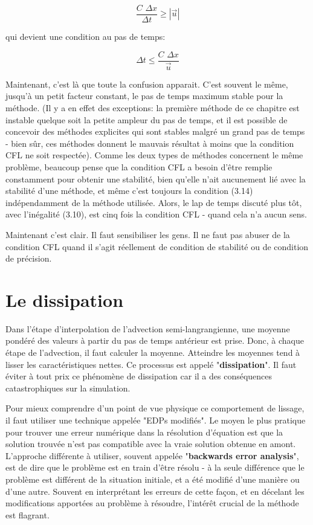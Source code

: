 \documentclass[11pt]{report}
\begin{document}
\begin{equation}
\frac{C\,\,\Delta x}{\Delta t} \geq |\overrightarrow{u}|
\end{equation}

qui devient une condition au pas de temps:

\begin{equation}
\Delta t \leq \frac{C\,\,\Delta x}{\overrightarrow{u}}
\end{equation}

Maintenant, c'est là que toute la confusion apparait. C'est souvent le même, jusqu'à un petit facteur constant, le pas de temps maximum stable pour la méthode. (Il y a en effet des exceptions: la première méthode de ce chapitre est instable quelque soit la petite ampleur du pas de temps, et il est possible de concevoir des méthodes explicites qui sont stables malgré un grand pas de temps - bien sûr, ces méthodes donnent le mauvais résultat à moins que la condition CFL ne soit respectée). Comme les deux types de méthodes concernent le même problème, beaucoup pense que la condition CFL a besoin d'être remplie constamment pour obtenir une stabilité, bien qu'elle n'ait aucunement lié avec la stabilité d'une méthode, et même c'est toujours la condition (3.14) indépendamment de la méthode utilisée. Alors, le lap de temps discuté plus tôt, avec l'inégalité (3.10), est cinq fois la condition CFL - quand cela n'a aucun sens.\newline

Maintenant c'est clair. Il faut sensibiliser les gens. Il ne faut pas abuser de la condition CFL quand il s'agit réellement de condition de stabilité ou de condition de précision. 

\section{Le dissipation}

Dans l'étape d'interpolation de l'advection semi-langrangienne, une moyenne pondéré des valeurs à partir du pas de temps antérieur est prise. Donc, à chaque étape de l'advection, il faut calculer la moyenne. Atteindre les moyennes tend à lisser les caractéristiques nettes. Ce processus est appelé "\textbf{dissipation}". Il faut éviter à tout prix ce phénomène de dissipation car il a des conséquences catastrophiques sur la simulation.

Pour mieux comprendre d'un point de vue physique ce comportement de lissage, il faut utiliser une technique appelée "EDPs modifiés". Le moyen le plus pratique pour trouver une erreur numérique dans la résolution d'équation est que la solution trouvée n'est pas compatible avec la vraie solution obtenue en amont. L'approche différente à utiliser, souvent appelée "\textbf{backwards error analysis}", est de dire que le problème est en train d'être résolu - à la seule différence que le problème est différent de la situation initiale, et a été modifié d'une manière ou d'une autre. Souvent en interprétant les erreurs de cette façon, et en décelant les modifications apportées au problème à résoudre, l'intérêt crucial de la méthode est flagrant.
\end{document}
